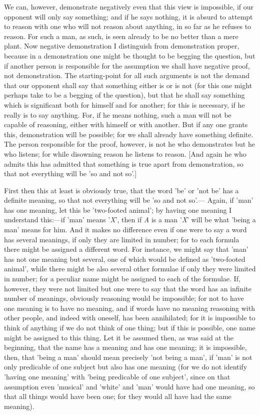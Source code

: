 We can, however, demonstrate negatively even that this view is impossible, if our opponent will only say something; and if he says nothing, it is absurd to attempt to reason with one who will not reason about anything, in so far as he refuses to reason. For such a man, as such, is seen already to be no better than a mere plant. Now negative demonstration I distinguish from demonstration proper, because in a demonstration one might be thought to be begging the question, but if another person is responsible for the assumption we shall have negative proof, not demonstration. The starting-point for all such arguments is not the demand that our opponent shall say that something either is or is not (for this one might perhaps take to be a begging of the question), but that he shall say something which is significant both for himself and for another; for this is necessary, if he really is to say anything. For, if he means nothing, such a man will not be capable of reasoning, either with himself or with another. But if any one grants this, demonstration will be possible; for we shall already have something definite. The person responsible for the proof, however, is not he who demonstrates but he who listens; for while disowning reason he listens to reason. [And again he who admits this has admitted that something is true apart from demonstration, so that not everything will be 'so and not so'.]

First then this at least is obviously true, that the word 'be' or 'not be' has a definite meaning, so that not everything will be 'so and not so'.— Again, if 'man' has one meaning, let this be 'two-footed animal'; by having one meaning I understand this:—if 'man' means '\emph{X}', then if \emph{A} is a man '\emph{X}' will be what 'being a man' means for him. And it makes no difference even if one were to say a word has several meanings, if only they are limited in number; for to each formula there might be assigned a different word. For instance, we might say that 'man' has not one meaning but several, one of which would be defined as 'two-footed animal', while there might be also several other formulae if only they were limited in number; for a peculiar name might be assigned to each of the formulae. If, however, they were not limited but one were to say that the word has an infinite number of meanings, obviously reasoning would be impossible; for not to have one meaning is to have no meaning, and if words have no meaning reasoning with other people, and indeed with oneself, has been annihilated; for it is impossible to think of anything if we do not think of one thing; but if this is possible, one name might be assigned to this thing. Let it be assumed then, as was said at the beginning, that the name has a meaning and has one meaning; it is impossible, then, that 'being a man' should mean precisely 'not being a man', if 'man' is not only predicable of one subject but also has one meaning (for we do not identify 'having one meaning' with 'being predicable of one subject', since on that assumption even 'musical' and 'white' and 'man' would have had one meaning, so that all things would have been one; for they would all have had the same meaning).

